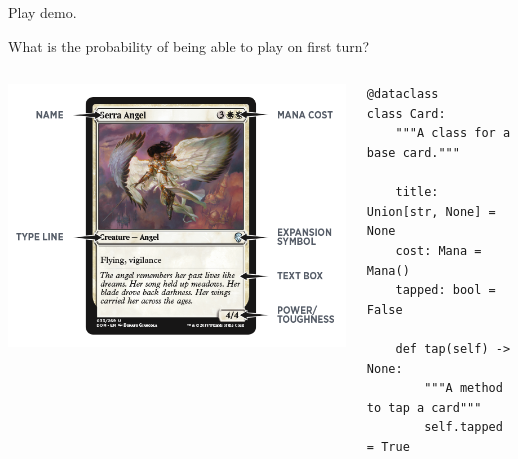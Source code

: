\documentclass{beamer}
\begin{document}
    \begin{frame}
        \begin{center}
            \Huge
            Play demo.
        \end{center}
    \end{frame}

    \begin{frame}
        \begin{center}
            \Huge
            What is the probability of being able to play on first turn?
        \end{center}
    \end{frame}

    \begin{frame}[fragile]
        \begin{columns}
            \begin{column}{.5\textwidth}
                \begin{center}
                    \includegraphics[height=.8\textwidth]{./img/serra_angel/main.png}
                \end{center}
            \end{column}
            \tiny
            \begin{column}{.5\textwidth}
                \begin{verbatim}
@dataclass
class Card:
    """A class for a base card."""

    title: Union[str, None] = None
    cost: Mana = Mana()
    tapped: bool = False

    def tap(self) -> None:
        """A method to tap a card"""
        self.tapped = True


\end{verbatim}
\end{column}
\end{columns}
\end{frame}
\end{document}
